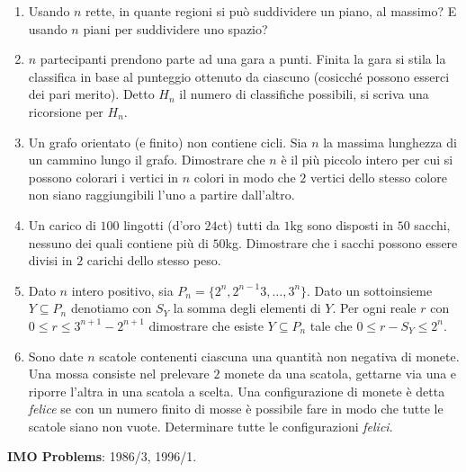 \documentclass[a4paper,10pt]{article}
\begin{document}
\begin{enumerate}
	Nel mese di febbraio, tocca allo gnome Febbraio fare visita ai
	suoi amici ed eventualmente ridipingere la casetta per
	``adeguarsi alla maggioranza'', e cos\`{\i} via.

	Questa procedura si ripete di anno in anno.  Si dimostri che, da
	un certo momento in poi, nessuno gnomo avr\`{a} pi\`{u} bisogno di
	ridipingere la sua casetta (si supponga l'amicizia simmetrica, e che
	ogni gnomo non includa se stesso nella lista dei suoi amici).

\item Usando $n$ rette, in quante regioni si pu\`o suddividere un piano, al massimo? E usando $n$ piani per suddividere uno spazio?
	\item $n$ partecipanti prendono parte ad una gara a punti. Finita la gara si stila la classifica in base al punteggio ottenuto da ciascuno (cosicch\'e possono esserci dei pari merito). Detto $H_n$ il numero di classifiche possibili, si scriva una ricorsione per $H_n$.
	\item Un grafo orientato (e finito) non contiene cicli. Sia $n$ la massima lunghezza di un cammino lungo il grafo. Dimostrare che $n$ \`e il pi\`u piccolo intero per cui si possono colorari i vertici in $n$ colori in modo che $2$ vertici dello stesso colore non siano raggiungibili l'uno a partire dall'altro.
	\item Un carico di $100$ lingotti (d'oro $24$ct) tutti da $1$kg sono disposti in $50$ sacchi, nessuno dei quali contiene pi\`u di $50$kg. Dimostrare che i sacchi possono essere divisi in $2$ carichi dello stesso peso.
	\item Dato $n$ intero positivo, sia $P_n=\{2^n,2^{n-1}3,\dots,3^n\}$. Dato un sottoinsieme $Y\subseteq P_n$ denotiamo con $S_Y$ la somma degli elementi di $Y$. Per ogni reale $r$ con $0\leq r \leq 3^{n+1}-2^{n+1}$ dimostrare che esiste $Y\subseteq P_n$ tale che $0\leq r-S_Y\leq 2^n$.
	\item Sono date $n$ scatole contenenti ciascuna una quantit\`a non negativa di monete. Una mossa consiste nel prelevare $2$ monete da una scatola, gettarne via una e riporre l'altra in una scatola a scelta. Una configurazione di monete \`e detta \textit{felice} se con un numero finito di mosse \`e possibile fare in modo che tutte le scatole siano non vuote. Determinare tutte le configurazioni \textit{felici}.

\end{enumerate}
\bigskip\bigskip

\textbf{IMO Problems}: 1986/3, 1996/1.
\end{document}
